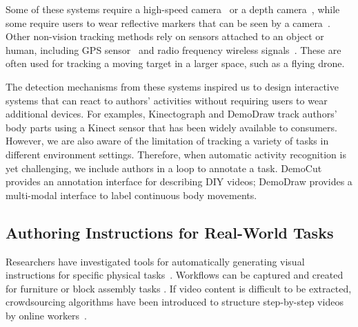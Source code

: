 Some of these systems require a high-speed camera~\cite{Okumura:2011tr} or a depth camera~\cite{Gupta:2012ku,Wilson:2012fb,Anderson:2013:YEM:2501988.2502045,dou-siggraph2016}, while some require users to wear reflective markers that can be seen by a camera~\cite{Ranjan:2008}.
%
Other non-vision tracking methods rely on sensors attached to an object or human, including GPS sensor~\cite{HexoDrone} and radio frequency wireless signals~\cite{Nguyen:2016:ICR:2935620.2935632}. These are often used for tracking a moving target in a larger space, such as a flying drone.

The detection mechanisms from these systems inspired us to design interactive systems that can react to authors' activities without requiring users to wear additional devices. For examples, Kinectograph and DemoDraw track authors' body parts using a Kinect sensor that has been widely available to consumers. However, we are also aware of the limitation of tracking a variety of tasks in different environment settings. Therefore, when automatic activity recognition is yet challenging, we include authors in a loop to annotate a task. DemoCut provides an annotation interface for describing DIY videos; DemoDraw provides a multi-modal interface to label continuous body movements.



\subsection{Authoring Instructions for Real-World Tasks}

Researchers have investigated tools for automatically generating visual instructions for specific physical tasks~\cite{feiner:1985:AEA:1299975.1300548,Seligmann:1991:AGI:127719.122732}. Workflows can be captured and created for furniture \cite{agrawala2003designing} or block assembly tasks \cite{Gupta:2012ku}.
%
If video content is difficult to be extracted, crowdsourcing algorithms have been introduced to structure step-by-step videos by online workers~\cite{Kim:2014:CSI:2611222.2556986}.

